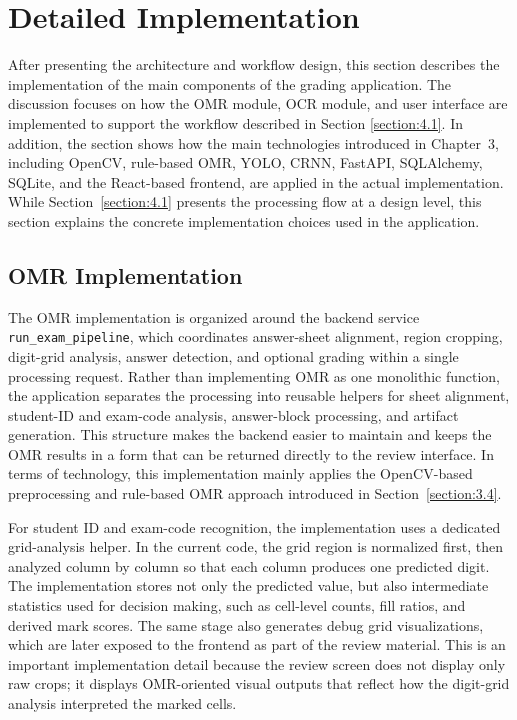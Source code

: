 \documentclass[../Main.tex]{subfiles}
\begin{document}
\section{Detailed Implementation}
\label{section:4.2}

After presenting the architecture and workflow design, this section describes
the implementation of the main components of the grading application. The
discussion focuses on how the OMR module, OCR module, and user
interface are implemented to support the workflow described in Section
\ref{section:4.1}. In addition, the section shows how the main technologies
introduced in Chapter~3, including OpenCV, rule-based OMR, YOLO, CRNN,
FastAPI, SQLAlchemy, SQLite, and the React-based frontend, are applied in the
actual implementation. While Section~\ref{section:4.1} presents the processing
flow at a design level, this section explains the concrete implementation
choices used in the application.

\subsection{OMR Implementation}
\label{subsection:4.2.1}

The OMR implementation is organized around the backend service
\texttt{run\_exam\_pipeline}, which coordinates answer-sheet alignment, region
cropping, digit-grid analysis, answer detection, and optional grading within a
single processing request. Rather than implementing OMR as one monolithic
function, the application separates the processing into reusable helpers for
sheet alignment, student-ID and exam-code analysis, answer-block processing, and
artifact generation. This structure makes the backend easier to maintain and
keeps the OMR results in a form that can be returned directly to the review
interface. In terms of technology, this implementation mainly applies the
OpenCV-based preprocessing and rule-based OMR approach introduced in
Section~\ref{section:3.4}.

For student ID and exam-code recognition, the implementation uses a dedicated
grid-analysis helper. In the current code, the grid region is normalized first,
then analyzed column by column so that each column produces one predicted digit.
The implementation stores not only the predicted value, but also intermediate
statistics used for decision making, such as cell-level counts, fill ratios, and
derived mark scores. The same stage also generates debug grid visualizations,
which are later exposed to the frontend as part of the review material. This is
an important implementation detail because the review screen does not display
only raw crops; it displays OMR-oriented visual outputs that reflect how the
digit-grid analysis interpreted the marked cells.
\end{document}
